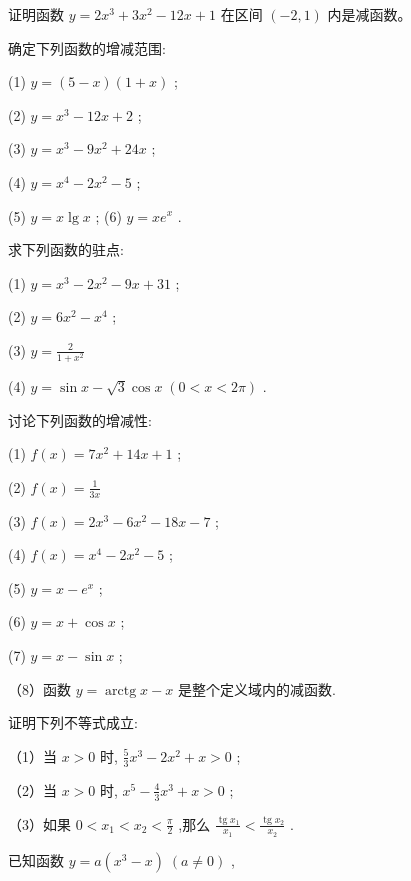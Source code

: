 \documentclass[lang=cn,newtx,10pt,scheme=chinese]{elegantbook}
\begin{document}
\begin{problemset}[习 题 十 一]

\item 证明函数 \(y = 2{x}^{3} + 3{x}^{2} - {12x} + 1\) 在区间 \(\left( {-2,1}\right)\) 内是减函数。

\item 确定下列函数的增减范围:

(1) \(y = \left( {5 - x}\right) \left( {1 + x}\right)\) ;

(2) \(y = {x}^{3} - {12x} + 2\) ;

(3) \(y = {x}^{3} - 9{x}^{2} + {24x}\) ;

(4) \(y = {x}^{4} - 2{x}^{2} - 5\) ;

(5) \(y = x\lg x\) ; (6) \(y = x{e}^{x}\) .

\item 求下列函数的驻点:

(1) \(y = {x}^{3} - 2{x}^{2} - {9x} + {31}\) ;

(2) \(y = 6{x}^{2} - {x}^{4}\) ;

(3) \(y = \frac{2}{1 + {x}^{2}}\)

(4) \(y = \sin x - \sqrt{3}\cos x\;\left( {0 < x < {2\pi }}\right)\) .

\item 讨论下列函数的增减性:

(1) \(f\left( x\right) = 7{x}^{2} + {14x} + 1\) ;

(2) \(f\left( x\right) = \frac{1}{3x}\)

(3) \(f\left( x\right) = 2{x}^{3} - 6{x}^{2} - {18x} - 7\) ;

(4) \(f\left( x\right) = {x}^{4} - 2{x}^{2} - 5\) ;

(5) \(y = x - {e}^{x}\) ;

(6) \(y = x + \cos x\) ;

(7) \(y = x - \sin x\) ;

（8）函数 \(y = \operatorname{arctg}x - x\) 是整个定义域内的减函数.

\item 证明下列不等式成立:

（1）当 \(x > 0\) 时, \(\frac{5}{3}{x}^{3} - 2{x}^{2} + x > 0\) ;

（2）当 \(x > 0\) 时, \({x}^{5} - \frac{4}{3}{x}^{3} + x > 0\) ;

（3）如果 \(0 < {x}_{1} < {x}_{2} < \frac{\pi }{2}\) ,那么 \(\frac{\operatorname{tg}{x}_{1}}{{x}_{1}} < \frac{\operatorname{tg}{x}_{2}}{{x}_{2}}\) .

\item 已知函数 \(y = a\left( {{x}^{3} - x}\right) \;\left( {a \neq 0}\right)\) ,


\end{problemset}
\end{document}
